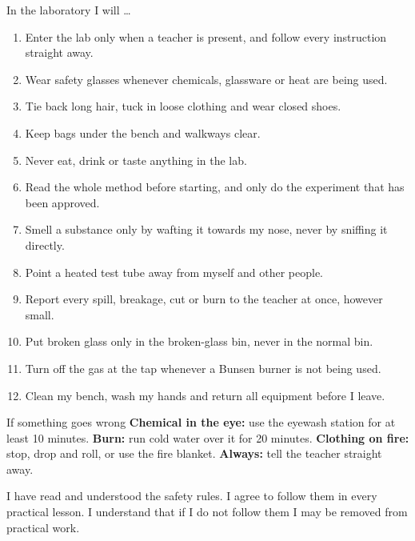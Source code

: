 \documentclass[11pt,a4paper]{article}
\begin{document}
\begin{infobox}{In the laboratory I will \dots}
\begin{enumerate}[leftmargin=1.6em, itemsep=3pt]
  \item Enter the lab only when a teacher is present, and follow every instruction straight away.
  \item Wear safety glasses whenever chemicals, glassware or heat are being used.
  \item Tie back long hair, tuck in loose clothing and wear closed shoes.
  \item Keep bags under the bench and walkways clear.
  \item Never eat, drink or taste anything in the lab.
  \item Read the whole method before starting, and only do the experiment that has been approved.
  \item Smell a substance only by wafting it towards my nose, never by sniffing it directly.
  \item Point a heated test tube away from myself and other people.
  \item Report every spill, breakage, cut or burn to the teacher at once, however small.
  \item Put broken glass only in the broken-glass bin, never in the normal bin.
  \item Turn off the gas at the tap whenever a Bunsen burner is not being used.
  \item Clean my bench, wash my hands and return all equipment before I leave.
\end{enumerate}
\end{infobox}

\begin{scaffold}{If something goes wrong}
\textbf{Chemical in the eye:} use the eyewash station for at least 10 minutes. \quad
\textbf{Burn:} run cold water over it for 20 minutes. \quad
\textbf{Clothing on fire:} stop, drop and roll, or use the fire blanket. \quad
\textbf{Always:} tell the teacher straight away.
\end{scaffold}

\vspace{6pt}
I have read and understood the safety rules. I agree to follow them in every practical lesson. I understand that if I do not follow them I may be removed from practical work.
\end{document}
